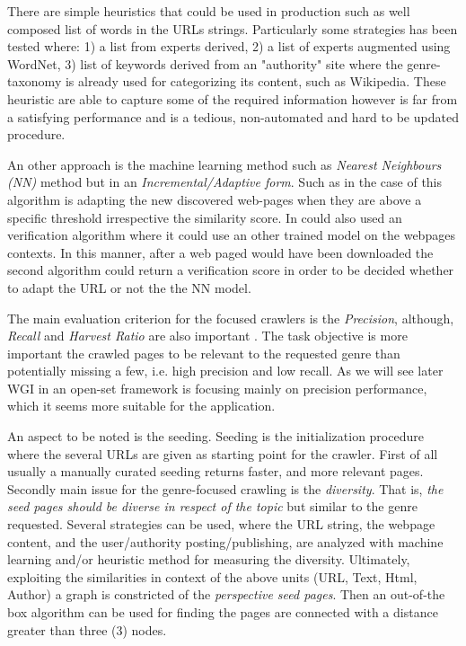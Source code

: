 There are simple heuristics that could be used in production such as well composed list of words in the URLs strings. Particularly some strategies has been tested where: 1) a list from experts derived, 2) a list of experts augmented using WordNet, 3) list of keywords derived from an "authority" site where the genre-taxonomy is already used for categorizing its content, such as Wikipedia. These heuristic are able to capture some of the required information however is far from a satisfying performance and is a tedious, non-automated and hard to be updated procedure.

An other approach is the machine learning method such as \textit{Nearest Neighbours (NN)} method but in an \textit{Incremental/Adaptive form}. Such as in the case of \parencite{jebari2015combination} this algorithm is adapting the new discovered web-pages when they are above a specific threshold irrespective the similarity score. In could also used an verification algorithm where it could use an other trained model on the webpages contexts. In this manner, after a web paged would have been downloaded the second algorithm could return a verification score in order to be decided whether to adapt the URL or not the the NN model. 

 The main evaluation criterion for the focused crawlers is the \textit{Precision}, although, \textit{Recall} and \textit{Harvest Ratio} are also important \parencite{priyatam2013don_URL}. The task objective is more important the crawled pages to be relevant to the requested genre than potentially missing a few, i.e. high precision and low recall. As we will see later WGI in an open-set framework is focusing mainly on precision performance, which it seems more suitable for the application. 
 
An aspect to be noted is the seeding. Seeding is the initialization procedure where the several URLs are given as starting point for the crawler. First of all usually a manually curated seeding returns faster, and more relevant pages. Secondly main issue for the genre-focused crawling is the \textit{diversity}. That is, \textit{the seed pages should be diverse in respect of the topic} but similar to the genre requested. Several strategies can be used, where the URL string, the webpage content, and the user/authority posting/publishing, are analyzed with machine learning and/or heuristic method for measuring the diversity. Ultimately, exploiting the similarities in context of the above units (URL, Text, Html, Author) a graph is constricted of the \textit{perspective seed pages}. Then an out-of-the box algorithm can be used for finding the pages are connected with a distance greater than three (3) nodes.
 
